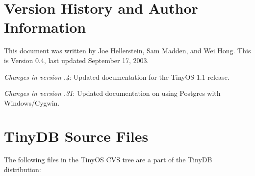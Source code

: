 \documentclass[11pt]{article}
\begin{document}
\section{Version History and Author Information}


This document was written by Joe Hellerstein, Sam Madden, and Wei Hong.  This
is Version 0.4, last updated September 17, 2003.


{\it Changes in version .4}: Updated documentation for the TinyOS 1.1 release.

{\it Changes in version .31}:   Updated documentation on using Postgres with Windows/Cygwin.



\appendix

\section{TinyDB Source Files}
\label{app:files}
The following files in the TinyOS CVS tree are a
part of the TinyDB distribution:
\end{document}
